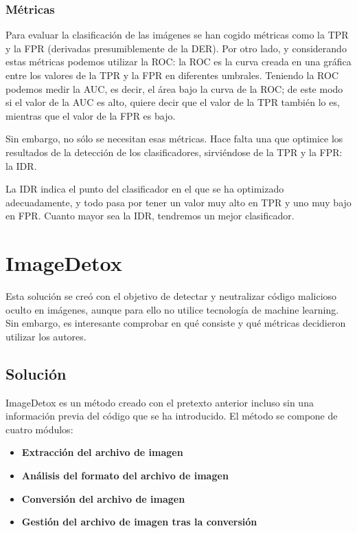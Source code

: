 \subsubsection{Métricas}

Para evaluar la clasificación de las imágenes se han cogido métricas como la \ac{TPR} y la \ac{FPR} (derivadas presumiblemente de la \ac{DER}). Por otro lado, y considerando estas métricas podemos utilizar la \ac{ROC}: la \ac{ROC} es la curva creada en una gráfica entre los valores de la \ac{TPR} y la \ac{FPR} en diferentes umbrales. Teniendo la \ac{ROC} podemos medir la \ac{AUC}, es decir, el área bajo la curva de la \ac{ROC}; de este modo si el valor de la \ac{AUC} es alto, quiere decir que el valor de la \ac{TPR} también lo es, mientras que el valor de la \ac{FPR} es bajo. %

Sin embargo, no sólo se necesitan esas métricas. Hace falta una que optimice los resultados de la detección de los clasificadores, sirviéndose de la \ac{TPR} y la \ac{FPR}: la \ac{IDR}. %


La \ac{IDR} indica el punto del clasificador en el que se ha optimizado adecuadamente, y todo pasa por tener un valor muy alto en \ac{TPR} y uno muy bajo en \ac{FPR}. Cuanto mayor sea la \ac{IDR}, tendremos un mejor clasificador.

\section{ImageDetox}

Esta solución se creó con el objetivo de detectar y neutralizar código malicioso oculto en imágenes, aunque para ello no utilice tecnología de machine learning. Sin embargo, es interesante comprobar en qué consiste y qué métricas decidieron utilizar los autores. %

\subsection{Solución}

ImageDetox es un método creado con el pretexto anterior incluso sin una información previa del código que se ha introducido. El método se compone de cuatro módulos:

\begin{itemize}
\item \textbf{Extracción del archivo de imagen}
\item \textbf{Análisis del formato del archivo de imagen}
\item \textbf{Conversión del archivo de imagen}
\item \textbf{Gestión del archivo de imagen tras la conversión}
\end{itemize}

